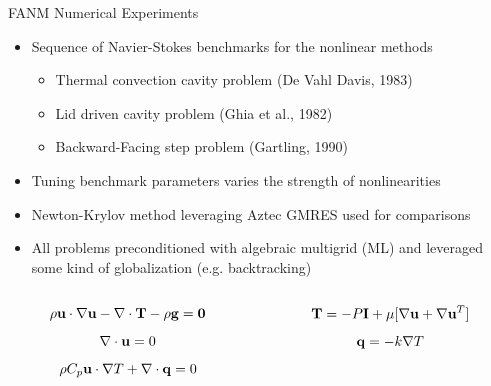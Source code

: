 \documentclass{beamer}
\begin{document}
\begin{frame}{FANM Numerical Experiments}

  \begin{itemize}
  \item Sequence of Navier-Stokes benchmarks for the nonlinear methods
    \begin{itemize}
    \item Thermal convection cavity problem (De Vahl Davis, 1983)
    \item Lid driven cavity problem (Ghia et al., 1982)
    \item Backward-Facing step problem (Gartling, 1990)
    \end{itemize}
    \medskip
  \item Tuning benchmark parameters varies the strength of
    nonlinearities
    \medskip
  \item Newton-Krylov method leveraging Aztec GMRES used for
    comparisons
    \medskip
  \item All problems preconditioned with algebraic multigrid (ML) and
    leveraged some kind of globalization (e.g. backtracking)
  \end{itemize}

  \medskip  \medskip
  \begin{columns}
    \begin{column}{0.5\textwidth}
      \[
      \rho \mathbf{u} \cdot \nabla \mathbf{u} - \nabla \cdot \mathbf{T} - \rho
      \mathbf{g} = \mathbf{0}
      \]
      \[
      \nabla \cdot \mathbf{u} = 0
      \]
      \[
      \rho C_p \mathbf{u} \cdot \nabla T + \nabla \cdot \mathbf{q} = 0
      \]
    \end{column}

    \begin{column}{0.5\textwidth}
      \[
      \mathbf{T} = -P \mathbf{I} + \mu[\nabla \mathbf{u} + \nabla \mathbf{u}^T]
      \]
      \[
      \mathbf{q} = - k \nabla T
      \]
    \end{column}
  \end{columns}

\end{frame}
\end{document}
